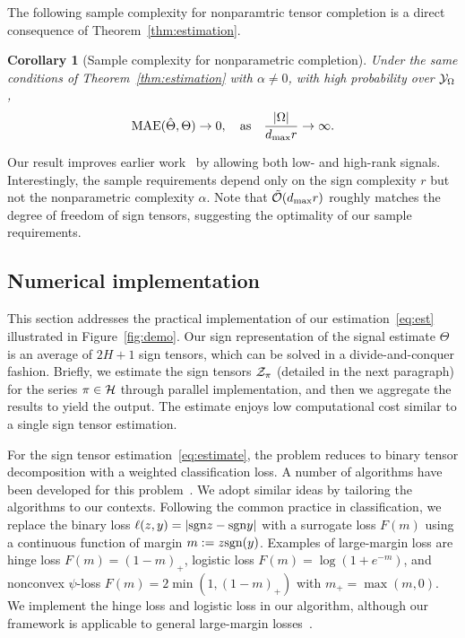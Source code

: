 \documentclass[11pt]{article}
\theoremstyle{plain}
\newtheorem{cor}{Corollary}
\theoremstyle{definition}
\def\sign{\textup{sgn}}
\begin{document}
The following sample complexity for nonparamtric tensor completion is a direct consequence of Theorem~\ref{thm:estimation}. 
\begin{cor}[Sample complexity for nonparametric completion] Under the same conditions of Theorem~\ref{thm:estimation} with $\alpha\neq 0$, with high probability over $\mathcal{Y}_\Omega$, 
\[
\textup{MAE}(\hat \Theta, \Theta)\to 0, \quad \text{as}\quad {|\Omega|\over {d_{\max}} r}\to \infty.
\]
\end{cor}
Our result improves earlier work~\citep{yuan2016tensor,ghadermarzy2019near,pmlr-v119-lee20i} by allowing both low- and high-rank signals. Interestingly, the sample requirements depend only on the sign complexity $r$ but not the nonparametric complexity $\alpha$. Note that $\tilde {\mathcal{O}}(d_{\max}r)$ roughly matches the degree of freedom of sign tensors, suggesting the optimality of our sample requirements. 

\subsection{Numerical implementation}
This section addresses the practical implementation of our estimation~\eqref{eq:est} illustrated in Figure~\ref{fig:demo}. Our sign representation of the signal estimate $\hat \Theta$ is an average of $2H+1$ sign tensors, which can be solved in a divide-and-conquer fashion. Briefly, we estimate the sign tensors $\mathcal{Z}_\pi$ (detailed in the next paragraph) for the series $\pi \in \mathcal{H}$ through parallel implementation, and then we aggregate the results to yield the output. The estimate enjoys low computational cost similar to a single sign tensor estimation.  


For the sign tensor estimation~\eqref{eq:estimate}, the problem reduces to binary tensor decomposition with a weighted classification loss. A number of algorithms have been developed for this problem~\citep{ghadermarzy2018learning,wang2018learning,hong2020generalized}. We adopt similar ideas by tailoring the algorithms to our contexts. Following the common practice in classification, we replace the binary loss $\ell(z,y)=|\sign z - \sign y|$ with a surrogate loss $F(m)$ using a continuous function of margin $m:=z\sign(y)$. Examples of large-margin loss are hinge loss $F(m) = (1-m)_+$, logistic loss $F(m) =\log(1+e^{-m})$, and nonconvex $\psi$-loss $F(m)=2\min(1,(1-m)_+)$ with $m_{+}=\max(m,0)$. We implement the hinge loss and logistic loss in our algorithm, although our framework is applicable to general large-margin losses~\citep{bartlett2006convexity}. 
\end{document}
